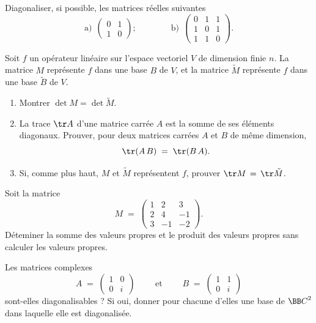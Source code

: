 \documentclass[12pt,french,oneside,a4paper]{memoir} %
\begin{document}
\begin{exo}
Diagonaliser, si possible, les matrices réelles suivantes
\begin{equation*}
\mathrm{a)}~~
\left( \begin{array}{rr}
0 &1 \\
1 &0 \end{array} \right) ;
\qquad\qquad\mathrm{b)}~~
\left( \begin{array}{rrr}
0 &1 &1 \\
1 &0 &1 \\
1 &1 &0 \end{array} \right).
\end{equation*}
\end{exo}
\begin{exo}
Soit $f$ un opérateur linéaire sur l'espace vectoriel $V$ de dimension finie $n$. La matrice $M$ représente $f$ dans une base $B$ de $V$, et la matrice $\tilde{M}$ représente $f$ dans une base $\tilde{B}$ de $V$. 
\begin{enumerate}
\item Montrer $\det M = \det \tilde{M}$. 
\item La trace $\tr A$ d'une matrice carrée $A$ est la somme de ses éléments diagonaux. Prouver, pour deux matrices carrées $A$ et $B$ de même dimension, 
\begin{equation*}
\tr(A\,B) \;=\; \tr(B\,A).
\end{equation*}
\item Si, comme plus haut, $M$ et $\tilde{M}$ représentent $f$, 
prouver $\tr M\,=\, \tr \tilde{M}$. 
\end{enumerate}
\end{exo}
\begin{exo}
Soit la matrice 
\begin{equation*}
M\;=\; \left( \begin{array}{rrr}
1 &2 &3 \\
2 &4 &-1 \\
3 &-1 &-2 \end{array} \right).
\end{equation*}
Déteminer la somme des valeurs propres et le produit des valeurs propres sans calculer les valeurs propres.
\end{exo}
\begin{exo}
Les matrices complexes
\begin{equation*}
A\;=\; \left( \begin{array}{rr}
1 &0 \\
0 &i \end{array} \right) \qquad \mbox{ et } \qquad 
B\;=\; \left( \begin{array}{rr}
1 &1 \\
0 &i \end{array} \right)
\end{equation*}
sont-elles diagonalisables ? Si oui, donner pour chacune d'elles une base de ${\BB C}^2$ dans laquelle elle est diagonalisée.
\end{exo}
\end{document}
